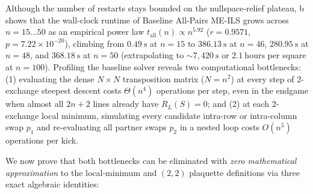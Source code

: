 Although the number of restarts stays bounded on the nullspace-relief plateau, b shows that the wall-clock runtime of Baseline All-Pairs ME-ILS grows across $n = 15\dots 50$ as an empirical power law $t_{\mathrm{all}}(n) \propto n^{5.92}$ ($r = 0.9571$, $p = 7.22\times 10^{-20}$), climbing from $0.49~\text{s}$ at $n = 15$ to $386.13~\text{s}$ at $n = 46$, $280.95~\text{s}$ at $n = 48$, and $368.18~\text{s}$ at $n = 50$ (extrapolating to $\sim 7{,}420~\text{s}$ or $2.1~\text{hours}$ per square at $n = 100$). Profiling the baseline solver reveals two computational bottlenecks: (1) evaluating the dense $N\times N$ transposition matrix ($N = n^2$) at every step of $2$-exchange steepest descent costs $\Theta(n^4)$ operations per step, even in the endgame when almost all $2n+2$ lines already have $R_L(S) = 0$; and (2) at each $2$-exchange local minimum, simulating every candidate intra-row or intra-column swap $p_1$ and re-evaluating all partner swaps $p_2$ in a nested loop costs $O(n^5)$ operations per kick.

We now prove that both bottlenecks can be eliminated with \emph{zero mathematical approximation} to the local-minimum and $(2,2)$ plaquette definitions via three exact algebraic identities:

